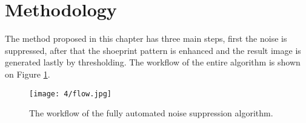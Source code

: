 \documentclass[draft,final]{vutinfth} %
\begin{document}
\section{Methodology}
\par
The method proposed in this chapter has three main steps, first the noise is suppressed, after that the shoeprint pattern is enhanced and the result image is generated lastly by thresholding.
The workflow of the entire algorithm is shown on Figure \ref{fig:fans:workflow}.

\begin{figure}[h]
  \centering
  \texttt{[image: 4/flow.jpg]}
  \caption{The workflow of the fully automated noise suppression algorithm.}
  \label{fig:fans:workflow} %
\end{figure}
\end{document}
